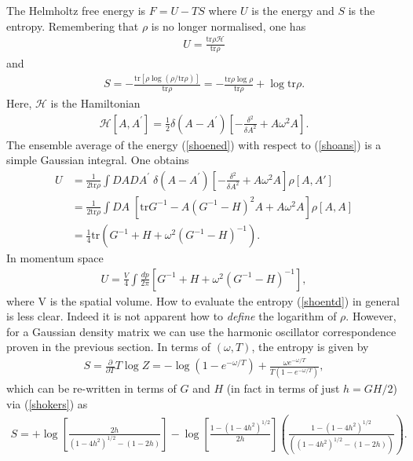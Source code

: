 \documentclass[a4paper,a4paper]{article}
\begin{document}
The Helmholtz free energy is $F = U - TS$ where $U$ is the energy and
$S$ is the entropy. Remembering that $\rho$ is no longer normalised, one has
\begin{gather} \label{shoened}
U = \frac{\mathrm{tr} \rho \mathcal{H}}{\mathrm{tr} \rho}
\end{gather}
and
\begin{gather} \label{shoentd}
S = -\frac{\mathrm{tr} [ \rho \log(\rho /\mathrm{tr} \rho) ]}{\mathrm{tr} \rho} 
= - \frac{\mathrm{tr} \rho \log{\rho}}{\mathrm{tr} \rho} + \log \mathrm{tr} \rho.
\end{gather}
Here, $\mathcal{H}$ is the Hamiltonian
\begin{gather}
\mathcal{H} [A,A^{'}]= \frac{1}{2} \delta(A - A^{'}) \left[ -\frac{\delta^2}{\delta A^2} + A \omega^2 A \right] .
\end{gather}
The ensemble average of the energy (\ref{shoened}) with respect to (\ref{shoans}) is a simple Gaussian integral. One obtains
\begin{align}
U &= \frac{1}{2\mathrm{tr} \rho} \int DADA^{'} \; 
\delta(A - A^{'}) \left[ -\frac{\delta^2}{\delta A^2} + A \omega^2 A \right] \rho[A,A'] \nonumber \\
 &=  \frac{1}{2\mathrm{tr} \rho} \int DA \; 
 [ \mathrm{tr} G^{-1} - A(G^{-1} - H)^2A + A \omega^2 A] \rho[A,A] \nonumber \\
 &= \frac{1}{4} \mathrm{tr} (G^{-1} + H + \omega^2 (G^{-1} - H)^{-1} ).
\end{align}
In momentum space
\begin{gather} \label{shoenec}
U = \frac{V}{4} \int \frac{dp}{2\pi} \left[ G^{-1} + H + \omega^2 (G^{-1} - H)^{-1} \right],
\end{gather}
where V is the spatial volume.
How to evaluate the entropy (\ref{shoentd}) in general is less clear. Indeed it is not apparent how to \emph{define} the 
logarithm of $\rho$. However,
for a Gaussian density matrix we can use the harmonic oscillator correspondence proven in the previous section. 
In terms of $(\omega,T)$, the entropy is given by
\begin{gather}
S = \frac{\partial}{\partial T} T\log{Z} = - \log (1-e^{-\omega /T}) +\frac{\omega e^{-\omega /T}}{T(1-e^{-\omega /T})},
\end{gather}
which can be re-written in terms of $G$ and $H$ (in fact in terms of just $h = GH/2$) via (\ref{shokers}) as
\begin{gather} \label{shoentk}
S =  + \log \left[ \frac{2h}{ (1-4h^2)^{1/2} - (1-2h)}\right] 
- \log \left[ \frac{1- (1-4h^2)^{1/2}}{2h}\right] 
\left( \frac{1- (1-4h^2)^{1/2}}{\left( (1-4h^2)^{1/2} - (1-2h)\right)} \right).
\end{gather}
\end{document}
